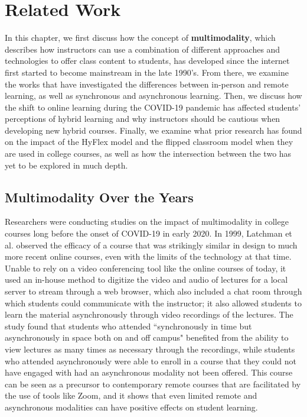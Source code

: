 \chapter{Related Work}

In this chapter, we first discuss how the concept of \textbf{multimodality}, which describes how instructors can use a combination of different approaches and technologies to offer class content to students, has developed since the internet first started to become mainstream in the late 1990's. From there, we examine the works that have investigated the differences between in-person and remote learning, as well as synchronous and asynchronous learning. Then, we discuss how the shift to online learning during the COVID-19 pandemic has affected students' perceptions of hybrid learning and why instructors should be cautious when developing new hybrid courses. Finally, we examine what prior research has found on the impact of the HyFlex model and the flipped classroom model when they are used in college courses, as well as how the intersection between the two has yet to be explored in much depth.

\section{Multimodality Over the Years}

Researchers were conducting studies on the impact of multimodality in college courses long before the onset of COVID-19 in early 2020. In 1999, Latchman et al. \cite{latchman1999information} observed the efficacy of a course that was strikingly similar in design to much more recent online courses, even with the limits of the technology at that time. Unable to rely on a video conferencing tool like the online courses of today, it used an in-house method to digitize the video and audio of lectures for a local server to stream through a web browser, which also included a chat room through which students could communicate with the instructor; it also allowed students to learn the material asynchronously through video recordings of the lectures. The study found that students who attended ``synchronously in time but asynchronously in space both on and off campus" benefited from the ability to view lectures as many times as necessary through the recordings, while students who attended asynchronously were able to enroll in a course that they could not have engaged with had an asynchronous modality not been offered. This course can be seen as a precursor to contemporary remote courses that are facilitated by the use of tools like Zoom, and it shows that even limited remote and asynchronous modalities can have positive effects on student learning.

